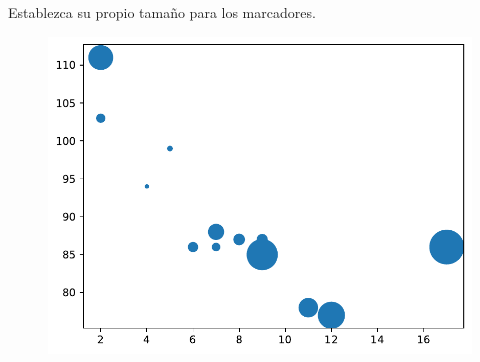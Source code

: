 \begin{code} Establezca su propio tamaño para los marcadores.

\begin{Shaded}
\begin{Highlighting}[]

\OperatorTok{=}\NormalTok{ np.array([}\NormalTok{,}\NormalTok{,}\NormalTok{,}\NormalTok{,}\NormalTok{,}\NormalTok{,}\NormalTok{,}\NormalTok{,}\NormalTok{,}\NormalTok{,}\NormalTok{,}\NormalTok{,}\NormalTok{])}
\OperatorTok{=}\NormalTok{ np.array([}\NormalTok{,}\NormalTok{,}\NormalTok{,}\NormalTok{,}\NormalTok{,}\NormalTok{,}\NormalTok{,}\NormalTok{,}\NormalTok{,}\NormalTok{,}\NormalTok{,}\NormalTok{,}\NormalTok{])}
\OperatorTok{=}\NormalTok{ np.array([}\NormalTok{,}\NormalTok{,}\NormalTok{,}\NormalTok{,}\NormalTok{,}\NormalTok{,}\NormalTok{,}\NormalTok{,}\NormalTok{,}\NormalTok{,}\NormalTok{,}\NormalTok{,}\NormalTok{])}

\OperatorTok{=}
\end{Highlighting}
\end{Shaded}

\begin{figure}
  \centering
  \includegraphics[scale=0.6]{img/grafica1042.pdf}
\end{figure}
\end{code}

